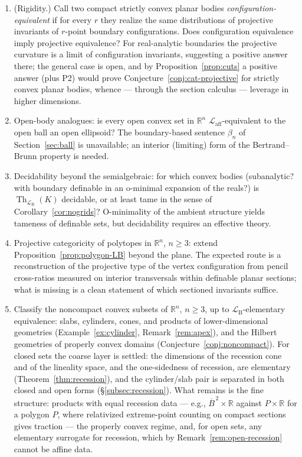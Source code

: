 \documentclass[11pt]{amsart}
\theoremstyle{definition}
\newcommand{\R}{\mathbb{R}}
\newcommand{\Laff}{\mathcal{L}_{\mathrm{aff}}}
\newcommand{\LB}{\mathcal{L}_{\mathrm{B}}}
\newcommand{\Th}{\operatorname{Th}}
\begin{document}
\begin{enumerate}[label=\textbf{P\arabic*.},leftmargin=2.6em]
$\emptyset$-definable from the operations $\{C_\lambda\}_{\lambda\in[0,1]}$
over every compact convex body in $\R^n$? A negative answer would separate
the pure barycentric language from $\Laff$ as used here; a positive answer
would make the inclusion of $B$ in $\Laff$ redundant.
\item (Rigidity.) Call two compact strictly convex planar bodies
\emph{configuration-equivalent} if for every $r$ they realize the same
distributions of projective invariants of $r$-point boundary
configurations. Does configuration equivalence imply projective
equivalence? For real-analytic boundaries the projective curvature is a
limit of configuration invariants, suggesting a positive answer there; the
general case is open, and by Proposition~\ref{prop:cuts} a positive answer
(plus P2) would prove Conjecture~\ref{conj:cat-projective} for strictly
convex planar bodies, whence --- through the section calculus --- leverage in
higher dimensions.
\item Open-body analogues: is every open convex set in $\R^n$
$\Laff$-equivalent to the open ball an open ellipsoid? The boundary-based
sentence $\beta_n$ of Section~\ref{sec:ball} is unavailable; an interior
(limiting) form of the Bertrand--Brunn property is needed.
\item Decidability beyond the semialgebraic: for which convex bodies
(subanalytic? with boundary definable in an o-minimal expansion of the
reals?) is $\Th_{\LB}(K)$ decidable, or at least tame in the sense of
Corollary~\ref{cor:nogrids}? O-minimality of the ambient structure yields
tameness of definable sets, but decidability requires an effective theory.
\item Projective categoricity of polytopes in $\R^n$, $n\ge3$: extend
Proposition~\ref{prop:polygon-LB} beyond the plane. The expected route is a
reconstruction of the projective type of the vertex configuration from
pencil cross-ratios measured on interior transversals within definable
planar sections; what is missing is a clean statement of which sectioned
invariants suffice.
\item Classify the noncompact convex subsets of $\R^n$, $n\ge3$, up to
$\LB$-elementary equivalence: slabs, cylinders, cones, and products of
lower-dimensional geometries (Example~\ref{ex:cylinder},
Remark~\ref{rem:apex}), and the Hilbert geometries of properly convex
domains (Conjecture~\ref{conj:noncompact}). For closed sets the coarse layer
is settled: the dimensions of the recession cone and of the lineality space,
and the one-sidedness of recession, are elementary
(Theorem~\ref{thm:recession}), and the cylinder/slab pair is separated in
both closed and open forms (\S\ref{subsec:recession}). What remains is the
fine structure: products with equal recession data --- e.g.,
$\overline B^{\,2}\times\R$ against $P\times\R$ for a polygon $P$, where
relativized extreme-point counting on compact sections gives traction ---
the properly convex regime, and, for open sets, any elementary surrogate for
recession, which by Remark~\ref{rem:open-recession} cannot be affine data.
\end{enumerate}
\end{document}
